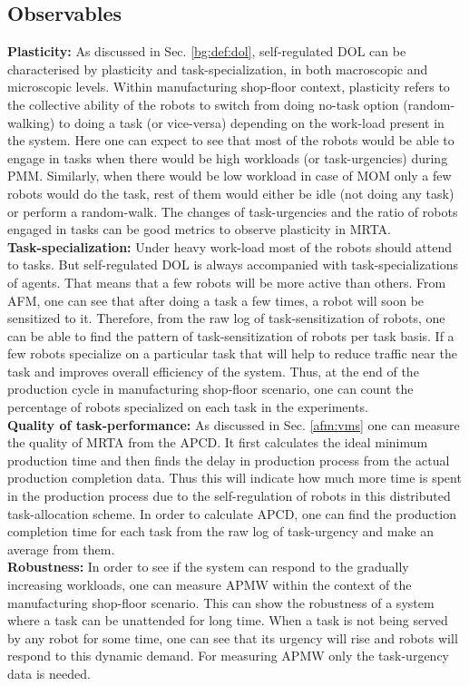 \subsection{Observables}
\textbf{Plasticity:} As discussed in Sec. \ref{bg:def:dol},  self-regulated DOL can be characterised by plasticity and task-specialization, in both macroscopic and microscopic levels. Within manufacturing shop-floor context, plasticity refers to the collective ability of the robots to switch from doing no-task option (random-walking) to doing a task (or vice-versa) depending on the work-load present in the system. Here one can expect to see that most of the robots would be able to engage in tasks when there would be high workloads (or task-urgencies) during PMM. Similarly, when there would be low workload in case of MOM only a few robots would do the task, rest of them would either be idle (not doing any task) or perform a random-walk.  The changes of task-urgencies and the ratio of robots engaged in tasks can be good metrics to observe plasticity in MRTA.\\
\textbf{Task-specialization:} Under heavy work-load most of the robots should attend to tasks. But self-regulated DOL is always accompanied with task-specializations of agents. That means that a few robots will be more active than others. From AFM, one can see that after doing a task a few times, a robot will soon be sensitized to it. Therefore, from the raw log of task-sensitization of robots, one can be able to find the pattern of task-sensitization of robots per task basis. If a few robots specialize on a particular task that will help to reduce traffic near the task and improves overall efficiency of the system. Thus, at the end of the production cycle in manufacturing shop-floor scenario, one can count the percentage of robots specialized on each task in the experiments.\\
\textbf{Quality of task-performance:} As discussed in Sec. \ref{afm:vms} one can measure the quality of MRTA from the APCD. It first calculates the ideal minimum production time and then finds the delay in production process from the actual production completion data. Thus this will indicate how much more time is  spent in the production process due to the self-regulation of robots in this distributed task-allocation scheme.  In order to calculate APCD, one can find the production completion time for each task from the raw log of task-urgency and make an average from them.\\
\textbf{Robustness:} In order to see if  the system can respond to the gradually increasing workloads,  one can measure APMW within the context of the manufacturing shop-floor scenario. This can show the robustness of a system where a task can be  unattended for long time. When a task is not being served by any robot for some time, one can see that its urgency will rise and robots will respond to this dynamic demand. For measuring APMW  only the task-urgency data is needed.\\
